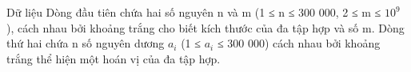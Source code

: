 Dữ liệu
Dòng đầu tiên chứa hai số nguyên n và m (1 ≤ n ≤ 300 000, 2 ≤ m ≤ $10^{9}$   ), cách nhau bởi khoảng trắng cho biết kích thước của đa tập hợp và số m. Dòng thứ hai chứa n số nguyên dương $a_{i}$   (1 ≤ $a_{i}$   ≤ 300 000) cách nhau bởi khoảng trắng thể hiện một hoán vị của đa tập hợp.